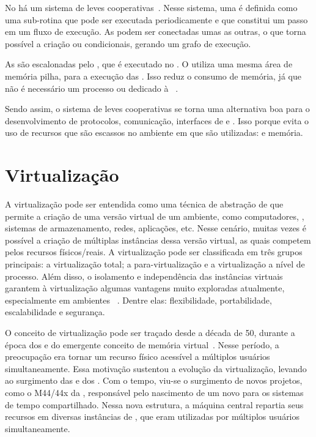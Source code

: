 No \nanvix há um sistema de \tasks leves cooperativas~\cite{souto:thesis}. Nesse sistema, uma \task é definida como uma sub-rotina que pode ser executada periodicamente e que constitui um passo em um fluxo de execução. As \tasks podem ser conectadas umas as outras, o que torna possível a criação \myloops ou condicionais, gerando um grafo de execução.

As \tasks são escalonadas pelo \dispatcher, que é executado no \mcore. O \dispatcher utiliza uma mesma área de memória \ie pilha, para a execução das \tasks. Isso reduz o consumo de memória, já que não é necessário um processo ou \thread dedicado à \task~\cite{souto:thesis}.

Sendo assim, o sistema de \tasks leves cooperativas se torna uma alternativa boa para o desenvolvimento de protocolos, comunicação, interfaces de \io e \daemons. Isso porque evita o uso de recursos que são escassos no ambiente em que são utilizadas: \thread e memória.

\section{Virtualização}
\label{sec.virtualizacao}
A virtualização pode ser entendida como uma técnica de abstração de \hardware que permite a criação de uma versão virtual de um ambiente, como computadores, \sos, sistemas de armazenamento, redes, aplicações, etc. Nesse cenário, muitas vezes é possível a criação de múltiplas instâncias dessa versão virtual, as quais competem pelos recursos físicos/reais. A virtualização pode ser classificada em três grupos principais: a virtualização total; a para-virtualização e a virtualização a nível de processo. Além disso, o isolamento e independência das instâncias virtuais garantem à virtualização algumas vantagens muito exploradas atualmente, especialmente em ambientes \cloud~\cite{manohar2013survey}. Dentre elas: flexibilidade, portabilidade, escalabilidade e segurança.

O conceito de virtualização pode ser traçado desde a década de 50, durante a época dos \mainframes e do emergente conceito de memória virtual~\cite{campbell2006introduction}. Nesse período, a preocupação era tornar um recurso físico acessível a múltiplos usuários simultaneamente. Essa motivação sustentou a evolução da virtualização, levando ao surgimento das \vms e dos \hypervisors. Com o tempo, viu-se o surgimento de novos projetos, como o M44/44x da \ibm, responsável pelo nascimento de um novo \design para os sistemas de tempo compartilhado. Nessa nova estrutura, a máquina central repartia seus recursos em diversas instâncias de \vms, que eram utilizadas por múltiplos usuários simultaneamente.

